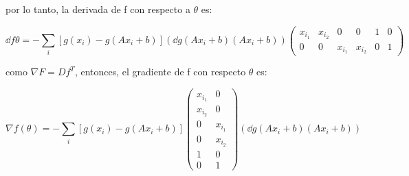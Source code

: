 por lo tanto, la derivada de f con respecto a $\theta$ es:

\begin{equation*}
    \dd{f}{\theta} = -\sum_i \left [ g(x_i)-g(Ax_i+b)\right ] \left ( \dd{g(Ax_i+b)}{(Ax_i+b)} \right ) \begin{pmatrix}
        x_{i_1} & x_{i_2} & 0       & 0       & 1 & 0 \\
        0       & 0       & x_{i_1} & x_{i_2} & 0 & 1
    \end{pmatrix}
\end{equation*}

como $\nabla F = Df^T$, entonces, el gradiente de f con respecto $\theta$ es:

\begin{equation*}
    \nabla f(\theta) = - \sum_i \left [ g(x_i)-g(Ax_i+b)\right ]  \begin{pmatrix}
        x_{i_1} & 0       \\
        x_{i_2} & 0       \\
        0       & x_{i_1} \\
        0       & x_{i_2} \\
        1       & 0       \\
        0       & 1
    \end{pmatrix} \left ( \dd{g(Ax_i+b)}{(Ax_i+b)} \right )
\end{equation*}